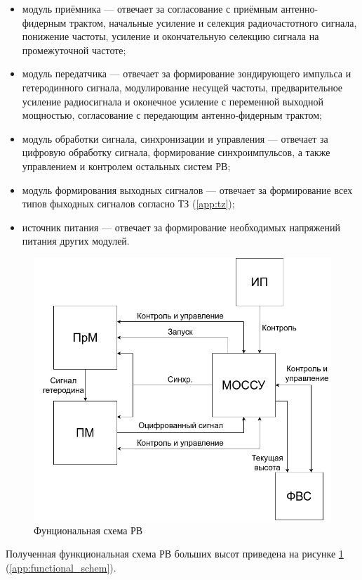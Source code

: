 \documentclass[utf8x, 14pt, oneside, a4paper]{article}
\begin{document}
			\begin{itemize}
				\item 	модуль приёмника --- отвечает за согласование с приёмным антенно-фидерным трактом, начальные усиление и селекция радиочастотного сигнала, понижение частоты, усиление и окончательную селекцию сигнала на промежуточной частоте;
				
				\item 	модуль передатчика --- отвечает за формирование зондирующего импульса и гетеродинного сигнала, модулирование несущей частоты, предварительное усиление радиосигнала и оконечное усиление с переменной выходной мощностью, согласование с передающим антенно-фидерным трактом;
				
				\item 	модуль обработки сигнала, синхронизации и управления --- отвечает за цифровую обработку сигнала, формирование синхроимпульсов, а также управлением и контролем остальных систем РВ;
				
				\item 	модуль формирования выходных сигналов --- отвечает за формирование всех типов фыходных сигналов согласно ТЗ (\ref{app:tz});
				
				\item 	источник питания --- отвечает за формирование необходимых напряжений питания других модулей. 
			\end{itemize}
			
			\begin{figure}[H]
				\centering
				\includegraphics[width=0.7\linewidth]{"Рисунки/Схемы/Функциональная схема"}
				\caption{Фунциональная схема РВ}
				\label{fig:func_schem}
			\end{figure}
			
			Полученная функциональная схема РВ больших высот приведена на рисунке \ref{fig:func_schem} (\ref{app:functional_schem}).
		
\end{document}
